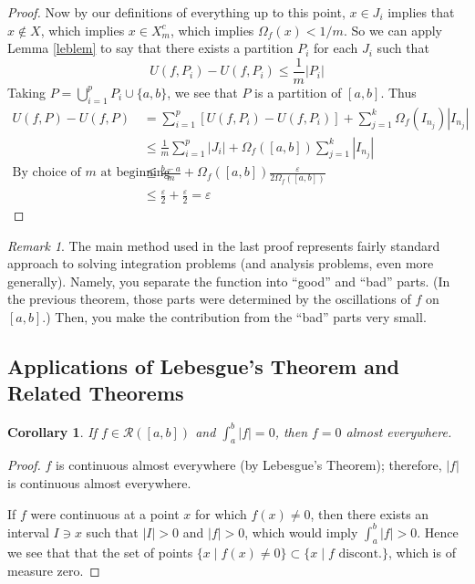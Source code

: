 \documentclass[12pt]{article}
\theoremstyle{plain}
\newtheorem{cor}[thm]{Corollary}
\theoremstyle{definition}
\theoremstyle{remark}
\newtheorem*{rmk}{Remark}
\begin{document}
\begin{proof}
Now by our definitions of everything up to this point, $x\in J_i$ implies that $x\not\in X$, which implies $x\in X^c_m$, which implies $\Omega_f(x) < 1/m$. So we can apply Lemma \ref{leblem} to say that there exists a partition $P_i$ for each $J_i$ such that 
\[ 
    U(f,P_i) - U(f,P_i) \leq \frac{1}{m}|P_i|
\]
Taking $P = \bigcup_{i=1}^p P_i \cup \{a,b\}$, we see that $P$ is a partition of $[a,b]$. Thus
\begin{align*}
    U(f,P) - U(f,P) &= \sum^p_{i=1} \left[
        U(f,P_i) - U(f,P_i)\right] + \sum^k_{j=1}
        \Omega_f(I_{n_j}) |I_{n_j}| \\
    &\leq \frac{1}{m} \sum^p_{i=1} |J_i| 
        + \Omega_f([a,b]) \sum^k_{j=1} |I_{n_j}| \\
    \text{By choice of $m$ at beginning} \quad 
        &\leq \frac{b-a}{m} + \Omega_f([a,b]) 
        \frac{\varepsilon}{2\Omega_f([a,b])} \\
    &\leq \frac{\varepsilon}{2} + \frac{\varepsilon}{2} =
        \varepsilon
\end{align*}
\end{proof}

\begin{rmk}
The main method used in the last proof represents fairly standard approach to solving integration problems (and analysis problems, even more generally).  Namely, you separate the function into ``good'' and ``bad'' parts. (In the previous theorem, those parts were determined by the oscillations of $f$ on $[a,b]$.) Then, you make the contribution from the ``bad'' parts very small.
\end{rmk}

\subsection{Applications of Lebesgue's Theorem and Related Theorems}

\begin{cor}
If $f\in\mathscr{R}([a,b])$ and $\int^b_a |f| = 0$, then $f=0$ almost everywhere.
\end{cor}

\begin{proof}
$f$ is continuous almost everywhere (by Lebesgue's Theorem); therefore, $|f|$ is continuous almost everywhere. 

If $f$ were continuous at a point $x$ for which $f(x)\neq 0$, then there exists an interval $I\ni x$ such that $|I|>0$ and $|f|>0$, which would imply $\int^b_a |f| > 0$. Hence we see that that the set of points $\{x \; | \; f(x)\neq 0\} \subset \{x \; | \; f \text{ discont.}\}$, which is of measure zero.
\end{proof}
\end{document}
